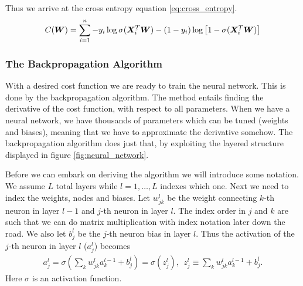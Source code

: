 \documentclass[12pt]{extarticle}
\begin{document}
Thus we arrive at the cross entropy equation \eqref{eq:cross_entropy}.
\begin{align}
	C(\boldsymbol W) = \sum_{i = 1}^{n} -y_i \log\sigma(\boldsymbol X_i^T \boldsymbol W) - (1 - y_i)\log\left[1 - \sigma(\boldsymbol X^T_i \boldsymbol W)\right]
	\label{eq:cross_entropy}
\end{align}
\subsubsection{The Backpropagation Algorithm}
With a desired cost function we are ready to train the neural network. This is done by the backpropagation algorithm. The method entails finding the derivative of the cost function, with respect to all parameters. When we have a neural network, we have thousands of parameters which can be tuned (weights and biases), meaning that we have to approximate the derivative somehow. The backpropagation algorithm does just that, by exploiting the layered structure displayed in figure \ref{fig:neural_network}.

Before we can embark on deriving the algorithm we will introduce some notation. We assume $L$ total layers while $l = 1, \dots , L$ indexes which one. Next we need to index the weights, nodes and biases. Let $w_{jk}^l$ be the weight connecting $k$-th neuron in layer $l-1$ and $j$-th neuron in layer $l$. The index order in $j$ and $k$ are such that we can do matrix multiplication with index notation later down the road. We also let $b_j^l$ be the $j$-th neuron bias in layer $l$. Thus the activation of the $j$-th neuron in layer $l$ ($a^l_j$) becomes
\begin{align}
	a_j^l = \sigma\left(\sum_{k} w_{jk}^l a_k^{l-1} + b_j^l\right) = \sigma(z_j^l), \ \ z_j^l \equiv \sum_{k} w_{jk}^l a_k^{l-1} + b_j^l.
	\label{eq:activation_of_node_ajl}
\end{align} 
Here $\sigma$ is an activation function.
\end{document}

